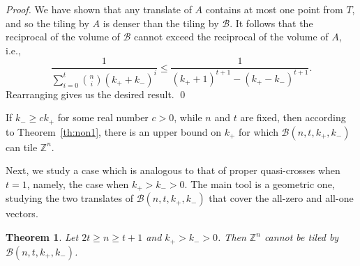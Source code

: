\documentclass[sort&compress]{elsarticle}
\newcommand{\cB}{\mathcal{B}}
\renewcommand{\leq}{\leqslant}
\renewcommand{\geq}{\geqslant}
\newtheorem{theorem}{Theorem}
\newcommand{\Z}{\mathbb{Z}}
\newcommand{\kp}{k_+}
\newcommand{\km}{k_-}
\newcommand{\BALL}{{\mathcal B}(n,t,\kp,\km)}
\begin{document}
\begin{proof}
We have shown that any translate of $A$ contains at most one point
from $T$, and so the tiling by $A$ is denser than the tiling by $\cB$.
It follows that the reciprocal of the volume of $\cB$ cannot exceed
the reciprocal of the volume of $A$, i.e.,
\[\frac{1}{\sum_{i=0}^t \binom{n}{i} (\kp+\km)^i}\leq \frac{1}{(\kp+1)^{t+1}-(\kp-\km)^{t+1}}.\]
Rearranging gives us the desired result. 
\qed\end{proof}

\begin{remark}
  If  $\km\geq c\kp$ for some real number $c>0$, while $n$ and $t$ are fixed, then according
  to Theorem~\ref{th:non1}, there is an upper bound on $\kp$ for which
  $\BALL$ can tile $\Z^n$.
\end{remark}

  Next, we study a case which is analogous to that of proper
  quasi-crosses when $t=1$, namely, the case when $\kp>\km>0$. The
  main tool is a geometric one, studying the two translates of $\BALL$
  that cover the all-zero and all-one vectors.


\begin{theorem}\label{thm:nge2t-1}
Let $2t\geq n\geq t+1$ and $\kp > \km > 0$. Then $\Z^n$ cannot be
tiled by $\BALL$.
\end{theorem}
\end{document}
